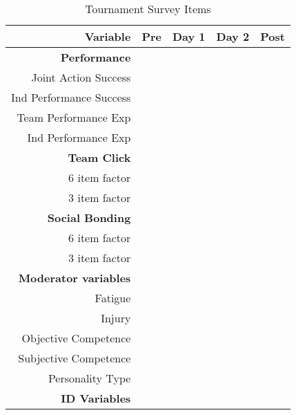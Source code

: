 \documentclass[english]{article}
\newcommand{\cmark}{\ding{51}}%
\begin{document}
  \begin{table}[htpb]\caption{Tournament Survey Items}
    \begin{center}
      \begin{small}
          \begin{tabular}{ r | c  c  c  c }
            \hline
            \bf Variable & \bf Pre &  \bf Day 1 & \bf Day 2 & \bf  Post \\
            \hline
            \bf Performance & & & & \\
            Joint Action Success & \cmark &   &   & \cmark\\
            Ind Performance Success & \cmark &   &   & \cmark \\
            Team Performance Exp &  & \cmark & \cmark & \cmark \\
            Ind Performance Exp &  & \cmark & \cmark & \cmark \\
             \bf Team Click & & & & \\
            6 item factor & \cmark &   &   & \cmark \\
            3 item factor & \cmark & \cmark & \cmark & \cmark \\
             \bf Social Bonding & & & & \\ 
            6 item factor & \cmark &   &   & \cmark \\
            3 item factor & \cmark & \cmark & \cmark & \cmark \\
             \bf Moderator variables & & & & \\ 
            Fatigue &   & \cmark & \cmark & \cmark \\
            Injury & \cmark  & \cmark & \cmark & \cmark \\
            Objective Competence & \cmark &   &   &   \\
            Subjective Competence & \cmark &   &   &   \\
            Personality Type & \cmark &   &   &   \\
            \bf ID Variables & \cmark &   &   &   \\
        \end{tabular}
      \end{small}
    \end{center}
  \end{table}
\end{document}
